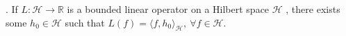 

\begin{theorem}
    . If $L : \mathcal{H} \rightarrow \mathbb{R}$ is a bounded linear operator on a Hilbert space $\mathcal{H}$ , there exists some $h_0 \in \mathcal{H}$ such that $L(f) = \langle f,h_0\rangle_\mathcal{H}, \ \forall f \in \mathcal{H}$.
\end{theorem}

